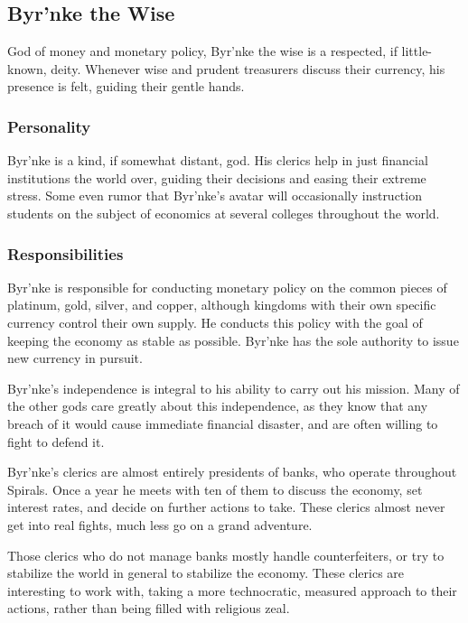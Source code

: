 \subsection*{Byr'nke the Wise}
\begin{goddesc}
\end{goddesc}

God of money and monetary policy, Byr'nke the wise is a respected, if little-known, deity.
Whenever wise and prudent treasurers discuss their currency, his presence is felt, guiding their gentle hands.

\subsubsection*{Personality}
Byr'nke is a kind, if somewhat distant, god.
His clerics help in just financial institutions the world over, guiding their decisions and easing their extreme stress.
Some even rumor that Byr'nke's avatar will occasionally instruction students on the subject of economics at several colleges throughout the world.

\subsubsection*{Responsibilities}
Byr'nke is responsible for conducting monetary policy on the common pieces of platinum, gold, silver, and copper, although kingdoms with their own specific currency control their own supply.
He conducts this policy with the goal of keeping the economy as stable as possible.
Byr'nke has the sole authority to issue new currency in pursuit.

Byr'nke's independence is integral to his ability to carry out his mission.
Many of the other gods care greatly about this independence, as they know that any breach of it would cause immediate financial disaster, and are often willing to fight to defend it.

Byr'nke's clerics are almost entirely presidents of banks, who operate throughout Spirals.
Once a year he meets with ten of them to discuss the economy, set interest rates, and decide on further actions to take.
These clerics almost never get into real fights, much less go on a grand adventure.

Those clerics who do not manage banks mostly handle counterfeiters, or try to stabilize the world in general to stabilize the economy.
These clerics are interesting to work with, taking a more technocratic, measured approach to their actions, rather than being filled with religious zeal.


